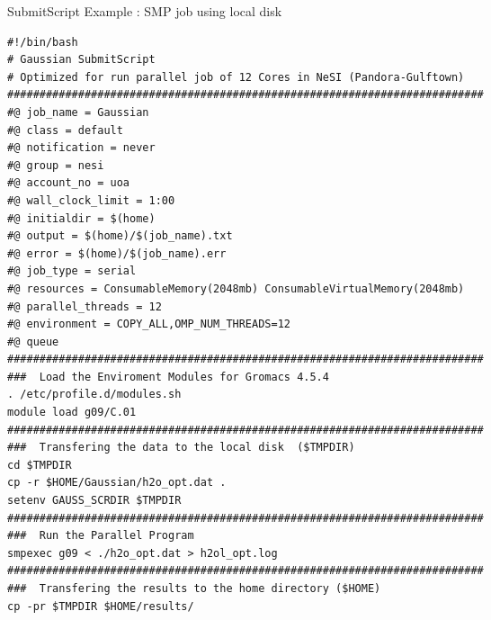 \documentclass[final,t]{beamer}
\begin{document}
 \begin{frame}[fragile]{} 
  \begin{columns}[t]
    \begin{column}{.35\linewidth}


      \begin{block}{SubmitScript Example : SMP job using local disk}
              \vspace*{-3ex}
        \begin{verbatim}
#!/bin/bash 
# Gaussian SubmitScript 
# Optimized for run parallel job of 12 Cores in NeSI (Pandora-Gulftown)
##########################################################################
#@ job_name = Gaussian
#@ class = default
#@ notification = never
#@ group = nesi
#@ account_no = uoa
#@ wall_clock_limit = 1:00
#@ initialdir = $(home)
#@ output = $(home)/$(job_name).txt
#@ error = $(home)/$(job_name).err
#@ job_type = serial
#@ resources = ConsumableMemory(2048mb) ConsumableVirtualMemory(2048mb)
#@ parallel_threads = 12
#@ environment = COPY_ALL,OMP_NUM_THREADS=12
#@ queue
########################################################################## 
###  Load the Enviroment Modules for Gromacs 4.5.4
. /etc/profile.d/modules.sh
module load g09/C.01
##########################################################################
###  Transfering the data to the local disk  ($TMPDIR)
cd $TMPDIR
cp -r $HOME/Gaussian/h2o_opt.dat . 
setenv GAUSS_SCRDIR $TMPDIR
##########################################################################
###  Run the Parallel Program
smpexec g09 < ./h2o_opt.dat > h2ol_opt.log
##########################################################################
###  Transfering the results to the home directory ($HOME) 
cp -pr $TMPDIR $HOME/results/
        \end{verbatim}
                \vspace*{-4ex}
      \end{block}


\end{column}
\end{columns}
\end{frame}
\end{document}
